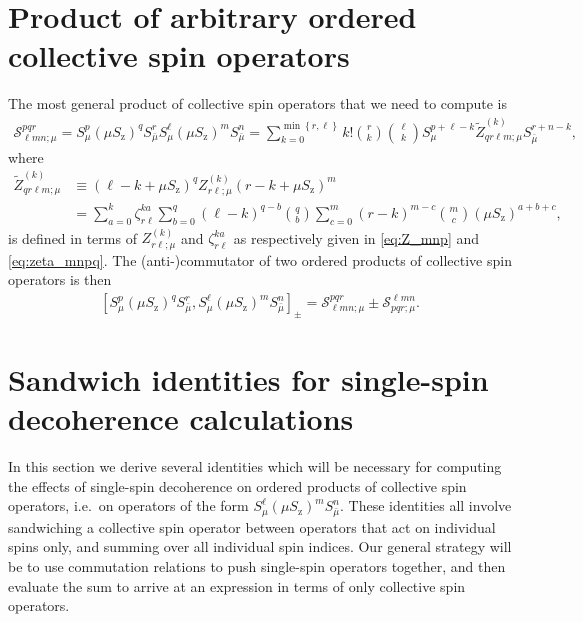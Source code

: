 \documentclass[pra,reprint,longbibliography]{revtex4-1}
\newcommand{\p}[1]{\left(#1\right)} %
\renewcommand{\sp}[1]{\left[#1\right]} %
\renewcommand{\set}[1]{\left\{#1\right\}} %
\renewcommand{\S}{\mathcal{S}}
\newcommand{\z}{\text{z}}
\newcommand{\bmu}{{\bar\mu}}
\newcommand{\1}{\mathds{1}}
\begin{document}
\section{Product of arbitrary ordered collective spin operators}
\label{sec:prod_general}

The most general product of collective spin operators that we need to
compute is
\begin{align}
  \S^{pqr}_{\ell mn;\mu}
  = S_\mu^p \p{\mu S_\z}^q S_\bmu^r
  S_\mu^\ell \p{\mu S_\z}^m S_\bmu^n
  = \sum_{k=0}^{\min\set{r,\ell}} k! { r \choose k } { \ell \choose k }
  S_\mu^{p+\ell-k} \tilde Z_{qr\ell m;\mu}^{(k)} S_\bmu^{r+n-k},
  \label{eq:general_product}
\end{align}
where
\begin{align}
  \tilde Z_{qr\ell m;\mu}^{(k)}
  &\equiv \p{\ell-k+\mu S_\z}^q
  Z_{r\ell;\mu}^{(k)} \p{r-k+\mu S_\z}^m \\
  &= \sum_{a=0}^k \zeta_{r\ell}^{ka}
  \sum_{b=0}^q \p{\ell-k}^{q-b} { q \choose b }
  \sum_{c=0}^m \p{r-k}^{m-c} { m \choose c }
  \p{\mu S_\z}^{a+b+c},
\end{align}
is defined in terms of $Z_{r\ell;\mu}^{(k)}$ and $\zeta_{r\ell}^{ka}$
as respectively given in \eqref{eq:Z_mnp} and \eqref{eq:zeta_mnpq}.
The (anti-)commutator of two ordered products of collective spin
operators is then
\begin{align}
  \sp{S_\mu^p \p{\mu S_\z}^q S_\bmu^r,
    S_\mu^\ell \p{\mu S_\z}^m S_\bmu^n}_\pm
  = \S^{pqr}_{\ell mn;\mu} \pm \S^{\ell mn}_{pqr;\mu}.
\end{align}


\section{Sandwich identities for single-spin decoherence calculations}
\label{sec:sandwich_single}

In this section we derive several identities which will be necessary
for computing the effects of single-spin decoherence on ordered
products of collective spin operators, i.e.~on operators of the form
$S_\mu^\ell \p{\mu S_\z}^m S_\bmu^n$.  These identities all involve
sandwiching a collective spin operator between operators that act on
individual spins only, and summing over all individual spin indices.
Our general strategy will be to use commutation relations to push
single-spin operators together, and then evaluate the sum to arrive at
an expression in terms of only collective spin operators.
\end{document}
